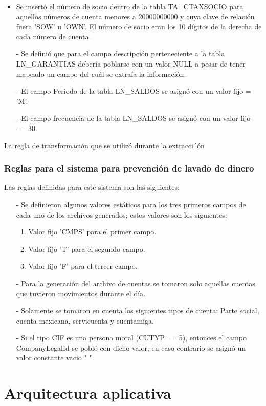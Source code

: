 \documentclass[a4paper,openright,12pt]{book}
\begin{document}
\begin{itemize}
\item Se insert\'o el n\'umero de socio dentro de la tabla TA\_CTAXSOCIO para aquellos n\'umeros de cuenta menores a 20000000000 y cuya clave de relaci\'on fuera 'SOW' u 'OWN'. El n\'umero de socio eran los 10 d\'igitos de la derecha de cada n\'umero de cuenta.
\item[-] Se defini\'o que para el campo descripci\'on perteneciente a la tabla LN\_GARANTIAS deber\'ia poblarse con un valor NULL a pesar de tener mapeado un campo del cu\'al se extra\'ia la informaci\'on. 
\item[-] El campo Periodo de la tabla LN\_SALDOS se asign\'o con un valor fijo = 'M'.
\item[-] El campo frecuencia de la tabla LN\_SALDOS se asign\'o con un valor fijo $=$ 30. 
\end{itemize}
La regla de transformaci\'on que se utiliz\'o durante la extracci´\'on 
\subsubsection{Reglas para el sistema para prevenci\'on de lavado de dinero}
Las reglas definidas para este sistema son las siguientes:
\begin{itemize}
\item[-] Se definieron algunos valores est\'aticos para los tres primeros campos de cada uno de los archivos generados; estos valores son los siguientes:
\begin{enumerate}
\item Valor fijo 'CMPS' para el primer campo.
\item Valor fijo 'T' para el segundo campo.
\item Valor fijo 'F' para el tercer campo.
\end{enumerate}
\item[-] Para la generaci\'on del archivo de cuentas se tomaron solo aquellas cuentas que tuvieron movimientos durante el d\'ia.
\item[-] Solamente se tomaron en cuenta los siguientes tipos de cuenta: Parte social, cuenta mexicana, servicuenta y cuentamiga.
\item[-] Si el tipo CIF es una persona moral (CUTYP $=$ 5), entonces el campo CompanyLegalId se pobl\'o con dicho valor, en caso contrario se asign\'o un valor constante vacio " ".
 
\end{itemize}

\section{Arquitectura aplicativa}
\end{document}
